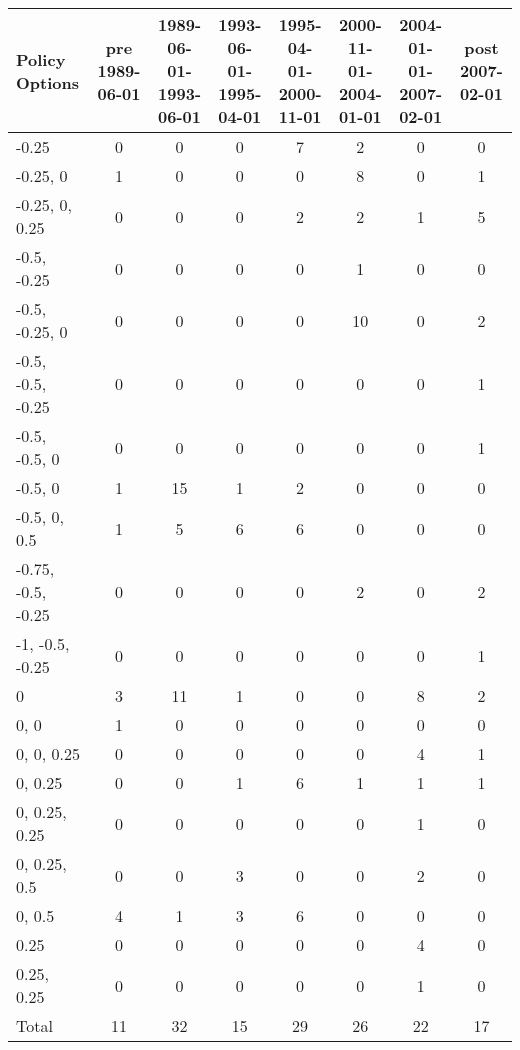 \begin{tabular}{lccccccc}
\hline\hline 
\addlinespace 
Policy Options & pre 1989-06-01 & \shortstack{1989-06-01- \\ 1993-06-01} & \shortstack{1993-06-01- \\ 1995-04-01} & \shortstack{1995-04-01- \\ 2000-11-01} & \shortstack{2000-11-01- \\ 2004-01-01} & \shortstack{2004-01-01- \\ 2007-02-01} & post 2007-02-01 \\ 
\hline 
-0.25 & 0 & 0 & 0 & 7 & 2 & 0 & 0 \\
-0.25, 0 & 1 & 0 & 0 & 0 & 8 & 0 & 1 \\
-0.25, 0, 0.25 & 0 & 0 & 0 & 2 & 2 & 1 & 5 \\
-0.5, -0.25 & 0 & 0 & 0 & 0 & 1 & 0 & 0 \\
-0.5, -0.25, 0 & 0 & 0 & 0 & 0 & 10 & 0 & 2 \\
-0.5, -0.5, -0.25 & 0 & 0 & 0 & 0 & 0 & 0 & 1 \\
-0.5, -0.5, 0 & 0 & 0 & 0 & 0 & 0 & 0 & 1 \\
-0.5, 0 & 1 & 15 & 1 & 2 & 0 & 0 & 0 \\
-0.5, 0, 0.5 & 1 & 5 & 6 & 6 & 0 & 0 & 0 \\
-0.75, -0.5, -0.25 & 0 & 0 & 0 & 0 & 2 & 0 & 2 \\
-1, -0.5, -0.25 & 0 & 0 & 0 & 0 & 0 & 0 & 1 \\
0 & 3 & 11 & 1 & 0 & 0 & 8 & 2 \\
0, 0 & 1 & 0 & 0 & 0 & 0 & 0 & 0 \\
0, 0, 0.25 & 0 & 0 & 0 & 0 & 0 & 4 & 1 \\
0, 0.25 & 0 & 0 & 1 & 6 & 1 & 1 & 1 \\
0, 0.25, 0.25 & 0 & 0 & 0 & 0 & 0 & 1 & 0 \\
0, 0.25, 0.5 & 0 & 0 & 3 & 0 & 0 & 2 & 0 \\
0, 0.5 & 4 & 1 & 3 & 6 & 0 & 0 & 0 \\
0.25 & 0 & 0 & 0 & 0 & 0 & 4 & 0 \\
0.25, 0.25 & 0 & 0 & 0 & 0 & 0 & 1 & 0 \\
\addlinespace 
Total & 11 & 32 & 15 & 29 & 26 & 22 & 17 \\
\hline 
\end{tabular}